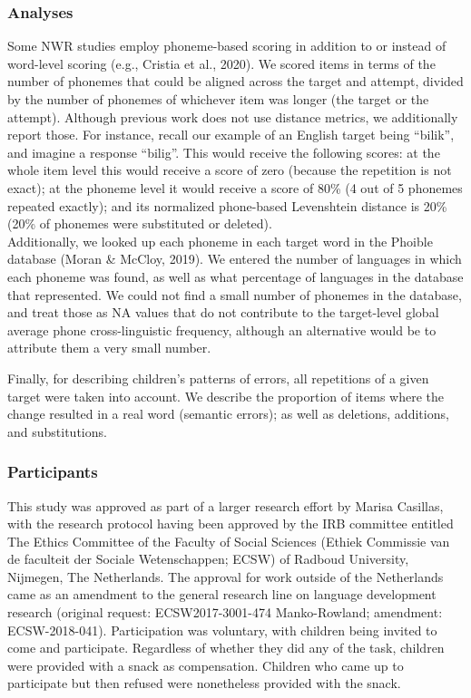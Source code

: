 \documentclass[english,,man,floatsintext]{apa6}
\begin{document}
\hypertarget{analyses}{%
\subsubsection{Analyses}\label{analyses}}

Some NWR studies employ phoneme-based scoring in addition to or instead of word-level scoring (e.g., Cristia et al., 2020). We scored items in terms of the number of phonemes that could be aligned across the target and attempt, divided by the number of phonemes of whichever item was longer (the target or the attempt). Although previous work does not use distance metrics, we additionally report those. For instance, recall our example of an English target being ``bilik'', and imagine a response ``bilig''. This would receive the following scores: at the whole item level this would receive a score of zero (because the repetition is not exact); at the phoneme level it would receive a score of 80\% (4 out of 5 phonemes repeated exactly); and its normalized phone-based Levenshtein distance is 20\% (20\% of phonemes were substituted or deleted).\\

Additionally, we looked up each phoneme in each target word in the Phoible database (Moran \& McCloy, 2019). We entered the number of languages in which each phoneme was found, as well as what percentage of languages in the database that represented. We could not find a small number of phonemes in the database, and treat those as NA values that do not contribute to the target-level global average phone cross-linguistic frequency, although an alternative would be to attribute them a very small number.

Finally, for describing children's patterns of errors, all repetitions of a given target were taken into account. We describe the proportion of items where the change resulted in a real word (semantic errors); as well as deletions, additions, and substitutions.

\hypertarget{participants}{%
\subsubsection{Participants}\label{participants}}

This study was approved as part of a larger research effort by Marisa Casillas, with the research protocol having been approved by the IRB committee entitled The Ethics Committee of the Faculty of Social Sciences (Ethiek Commissie van de faculteit der Sociale Wetenschappen; ECSW) of Radboud University, Nijmegen, The Netherlands. The approval for work outside of the Netherlands came as an amendment to the general research line on language development research (original request: ECSW2017-3001-474 Manko-Rowland; amendment: ECSW-2018-041). Participation was voluntary, with children being invited to come and participate. Regardless of whether they did any of the task, children were provided with a snack as compensation. Children who came up to participate but then refused were nonetheless provided with the snack.
\end{document}
